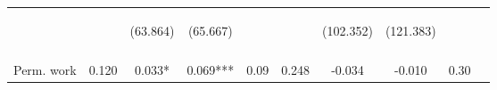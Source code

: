 \begin{tabular}{lccccccccc}
 & \begin{footnotesize}\end{footnotesize} & \begin{footnotesize}(63.864)\end{footnotesize} & \begin{footnotesize}(65.667)\end{footnotesize} & \begin{footnotesize}\end{footnotesize} & \begin{footnotesize}\end{footnotesize} & \begin{footnotesize}(102.352)\end{footnotesize} & \begin{footnotesize}(121.383)\end{footnotesize} & \begin{footnotesize}\end{footnotesize} & \begin{footnotesize}\end{footnotesize}\\
 & \begin{footnotesize}\end{footnotesize} & \begin{footnotesize}[0.437]\end{footnotesize} & \begin{footnotesize}[1.000]\end{footnotesize} & \begin{footnotesize}\end{footnotesize} & \begin{footnotesize}\end{footnotesize} & \begin{footnotesize}[0.753]\end{footnotesize} & \begin{footnotesize}[0.096]\end{footnotesize} & \begin{footnotesize}\end{footnotesize} & \begin{footnotesize}\end{footnotesize}\\
\noalign{\smallskip}Perm. work & 0.120 & 0.033* & 0.069*** & 0.09 & 0.248 & -0.034 & -0.010 & 0.30 & \\

\end{tabular}
